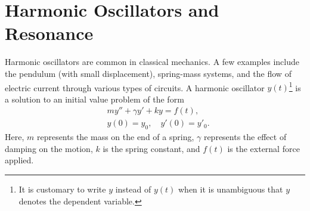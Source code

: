 \section*{Harmonic Oscillators and Resonance}
Harmonic oscillators are common in classical mechanics.
A few examples include the pendulum (with small displacement), spring-mass systems, and the flow of electric current through various types of circuits.
A harmonic oscillator $y(t)$\footnote{It is customary to write $y$ instead of $y(t)$ when it is unambiguous that $y$ denotes the dependent variable.} is a solution to an initial value problem of the form 
\begin{align*}
	&{}my'' + \gamma y' + ky = f(t) ,\\
	&{}y(0) = y_0,\quad
	y'(0) = y'_0.
\end{align*}
Here, $m$ represents the mass on the end of a spring, $\gamma$ represents the effect of damping on the motion, $k$ is the spring constant, and $f(t)$ is the external force applied.

